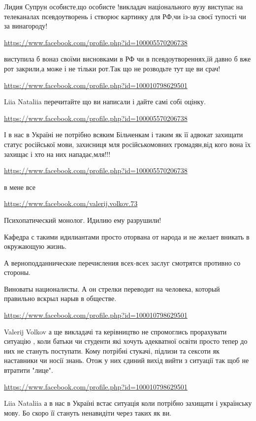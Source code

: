 \documentclass[a4paper,11pt]{extreport}
\begin{document}
\begin{itemize}
\begin{itemize}
Лидия Супрун особисте,що особисте !викладач національного вузу виступає на телеканалах псевдоутворень і створює картинку для РФ,чи із-за своєї тупості чи за винагороду!

\url{https://www.facebook.com/profile.php?id=100005570206738}

виступила б воназ своїми висновками в РФ чи в псевдоутвореннях,їй давно б вже рот закрили,а може і не тільки рот.Так що не розводьте тут ще ви срач!

\url{https://www.facebook.com/profile.php?id=100010798629501}

Liia Nataliia перечитайте що ви написали і дайте самі собі оцінку.

\url{https://www.facebook.com/profile.php?id=100005570206738}

І в нас в Україні не потрібно всяким Більченкам і таким як її адвокат захищати статус російської мови, захисниця мля російськомовних громадян,від кого вона їх захищає і хто на них нападає,мля!!!

\url{https://www.facebook.com/profile.php?id=100005570206738}

в мене все

\url{https://www.facebook.com/valerij.volkov.73}

Психопатический монолог.
Идилию ему разрушили!

Кафедра с такими идилиантами просто оторвана от народа и не желает вникать в окружающую жизнь.

А верноподданнические перечисления всех-всех заслуг смотрятся противно со стороны.

Виноваты националисты.
А он стрелки переводит на человека, который правильно вскрыл нарыв в обществе.

\url{https://www.facebook.com/profile.php?id=100010798629501}

Valerij Volkov а ще викладачі та керівництво не спромоглись прорахувати ситуацію , коли батьки чи студенти які хочуть адекватної освіти просто тепер до них не стануть поступати.
Кому потрібні стукачі, підлизи та сексоти як наставники чи носії знань.
Отож у них єдиний вихід вийти з ситуації так щоб не втратити "лице".

\url{https://www.facebook.com/profile.php?id=100010798629501}

Liia Nataliia а в нас в Україні встає ситуація коли потрібно захищати і українську мову. Бо скоро її стануть ненавидіти через таких як ви.


\end{itemize}
\end{itemize}
\end{document}
